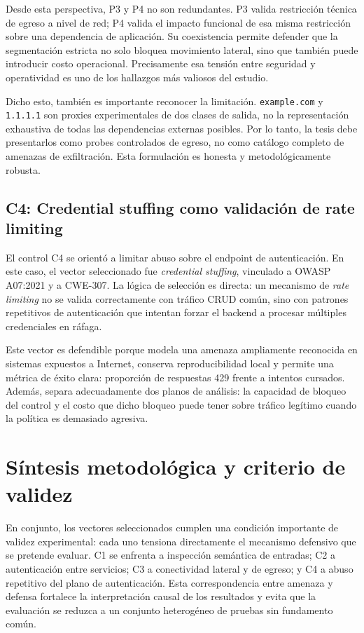 Desde esta perspectiva, P3 y P4 no son redundantes. P3 valida restricción técnica de egreso a nivel de red; P4 valida el impacto funcional de esa misma restricción sobre una dependencia de aplicación. Su coexistencia permite defender que la segmentación estricta no solo bloquea movimiento lateral, sino que también puede introducir costo operacional. Precisamente esa tensión entre seguridad y operatividad es uno de los hallazgos más valiosos del estudio.

Dicho esto, también es importante reconocer la limitación. \texttt{example.com} y \texttt{1.1.1.1} son proxies experimentales de dos clases de salida, no la representación exhaustiva de todas las dependencias externas posibles. Por lo tanto, la tesis debe presentarlos como probes controlados de egreso, no como catálogo completo de amenazas de exfiltración. Esta formulación es honesta y metodológicamente robusta.

\subsection{C4: Credential stuffing como validación de rate limiting}

El control C4 se orientó a limitar abuso sobre el endpoint de autenticación. En este caso, el vector seleccionado fue \textit{credential stuffing}, vinculado a OWASP A07:2021 y a CWE-307. La lógica de selección es directa: un mecanismo de \textit{rate limiting} no se valida correctamente con tráfico CRUD común, sino con patrones repetitivos de autenticación que intentan forzar el backend a procesar múltiples credenciales en ráfaga.

Este vector es defendible porque modela una amenaza ampliamente reconocida en sistemas expuestos a Internet, conserva reproducibilidad local y permite una métrica de éxito clara: proporción de respuestas 429 frente a intentos cursados. Además, separa adecuadamente dos planos de análisis: la capacidad de bloqueo del control y el costo que dicho bloqueo puede tener sobre tráfico legítimo cuando la política es demasiado agresiva.

\section{Síntesis metodológica y criterio de validez}

En conjunto, los vectores seleccionados cumplen una condición importante de validez experimental: cada uno tensiona directamente el mecanismo defensivo que se pretende evaluar. C1 se enfrenta a inspección semántica de entradas; C2 a autenticación entre servicios; C3 a conectividad lateral y de egreso; y C4 a abuso repetitivo del plano de autenticación. Esta correspondencia entre amenaza y defensa fortalece la interpretación causal de los resultados y evita que la evaluación se reduzca a un conjunto heterogéneo de pruebas sin fundamento común.

